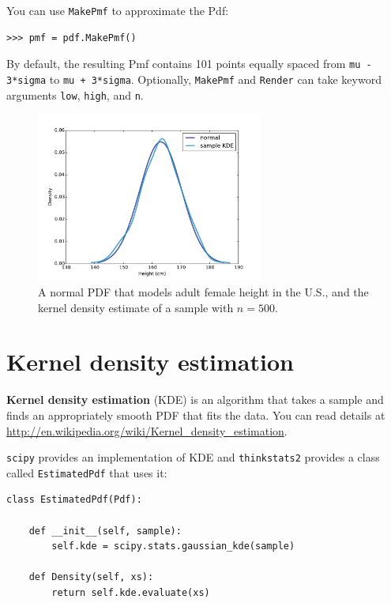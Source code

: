 \documentclass[12pt]{book}
\begin{document}
You can use {\tt MakePmf} to approximate the Pdf:

\begin{verbatim}
>>> pmf = pdf.MakePmf()
\end{verbatim}

By default, the resulting Pmf contains 101 points equally spaced from
{\tt mu - 3*sigma} to {\tt mu + 3*sigma}.  Optionally, {\tt MakePmf}
and {\tt Render} can take keyword arguments {\tt low}, {\tt high},
and {\tt n}.

\begin{figure}
\centerline{\includegraphics[height=2.2in]{figs/pdf_example.pdf}}
\caption{A normal PDF that models adult female height in the U.S.,
and the kernel density estimate of a sample with $n=500$.}
\label{pdf_example}
\end{figure}


\section{Kernel density estimation} 

{\bf Kernel density estimation} (KDE) is an algorithm that takes
a sample and finds an appropriately smooth PDF that fits 
the data.  You can read details at
\url{http://en.wikipedia.org/wiki/Kernel_density_estimation}.

{\tt scipy} provides an implementation of KDE and {\tt thinkstats2}
provides a class called {\tt EstimatedPdf} that uses it:

\begin{verbatim}
class EstimatedPdf(Pdf):

    def __init__(self, sample):
        self.kde = scipy.stats.gaussian_kde(sample)

    def Density(self, xs):
        return self.kde.evaluate(xs)
\end{verbatim}
\end{document}
